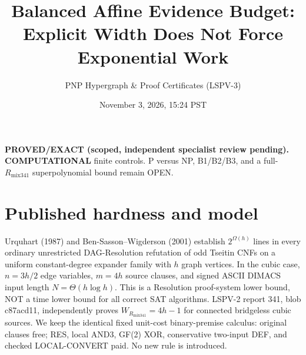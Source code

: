 \documentclass[11pt]{article}
\title{Balanced Affine Evidence Budget: Explicit Width Does Not Force Exponential Work}
\author{PNP Hypergraph \& Proof Certificates (LSPV-3)}
\date{November 3, 2026, 15:24 PST}
\begin{document}
\maketitle
\noindent\textbf{PROVED/EXACT (scoped, independent specialist review pending).} \textbf{COMPUTATIONAL} finite controls. P versus NP, B1/B2/B3, and a full-$R_{\mathrm{mix341}}$ superpolynomial bound remain OPEN.

\section*{Published hardness and model}
Urquhart (1987) and Ben-Sasson--Wigderson (2001) establish $2^{\Omega(h)}$ lines in every ordinary unrestricted DAG-Resolution refutation of odd Tseitin CNFs on a uniform constant-degree expander family with $h$ graph vertices. In the cubic case, $n=3h/2$ edge variables, $m=4h$ source clauses, and signed ASCII DIMACS input length $N=\Theta(h\log h)$. This is a Resolution proof-system lower bound, NOT a time lower bound for all correct SAT algorithms. LSPV-2 report 341, blob c87acd11, independently proves $W_{R_{\mathrm{mix341}}}=4h-1$ for connected bridgeless cubic sources. We keep the identical fixed unit-cost binary-premise calculus: original clauses free; RES, local AND3, GF(2) XOR, conservative two-input DEF, and checked LOCAL-CONVERT paid. No new rule is introduced.
\end{document}

